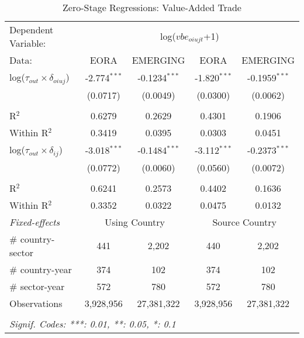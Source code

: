 \documentclass[a4paper]{article}
\begin{document}
\begin{table}[htbp]
   \caption{\label{tab:ZS_FULL} Zero-Stage Regressions: Value-Added Trade}
   \centering
   \begin{tabular}{lcccc}
      \tabularnewline \toprule
      Dependent Variable: & \multicolumn{4}{c}{log($vbe_{oiujt}$+1)}\\ \cmidrule(lr){2-5}
      Data:                               & EORA           & EMERGING        & EORA           & EMERGING \\   
      \midrule
      log($\tau_{out}\times \delta_{oiuj}$) & -2.774$^{***}$ & -0.1234$^{***}$ & -1.820$^{***}$ & -0.1959$^{***}$\\    
                                           & (0.0717)       & (0.0049)        & (0.0300)       & (0.0062)\\  \\   
      R$^2$                               & 0.6279         & 0.2629          & 0.4301         & 0.1906\\ 
      Within R$^2$                         & 0.3419         & 0.0395          & 0.0303         & 0.0451\\  
      \midrule
      log($\tau_{out}\times \delta_{ij}$)   & -3.018$^{***}$ & -0.1484$^{***}$ & -3.112$^{***}$ & -0.2373$^{***}$\\  
                                          & (0.0772)       & (0.0060)        & (0.0560)       & (0.0072)\\  \\
      R$^2$                               & 0.6241         & 0.2573          & 0.4402         & 0.1636\\  
      Within R$^2$                        & 0.3352         & 0.0322          & 0.0475         & 0.0132\\    
      \midrule
      \emph{Fixed-effects} & \multicolumn{2}{c}{Using Country} & \multicolumn{2}{c}{Source Country} \\
      \# country-sector      & 441            & 2,202             & 440            & 2,202\\  
      \# country-year               & 374            & 102             & 374            & 102\\   
      \# sector-year                & 572            & 780             & 572            & 780\\
     \midrule
      Observations                        & 3,928,956      & 27,381,322      & 3,928,956      & 27,381,322\\ 
      \bottomrule \\ [-0.9em]
      \multicolumn{5}{l}{\emph{Signif. Codes: ***: 0.01, **: 0.05, *: 0.1}}\\
   \end{tabular}
\end{table}
\FloatBarrier
\end{document}
